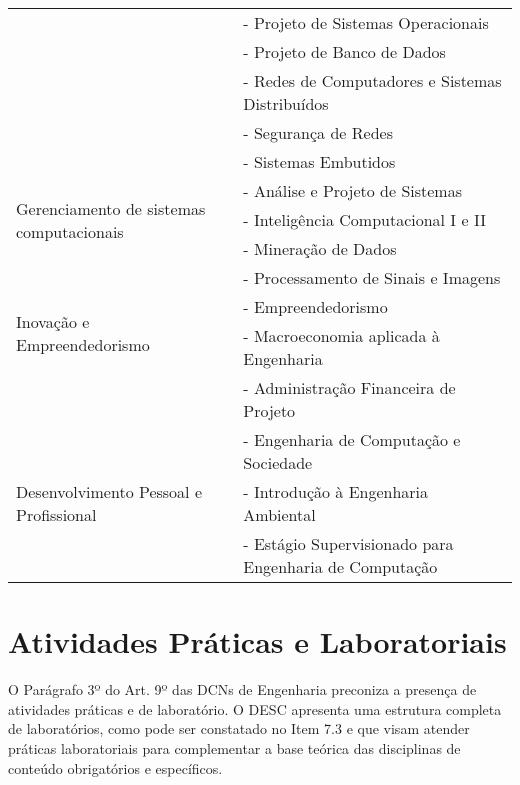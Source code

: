 \begin{table}[ht]
\begin{tabularx}{\textwidth}{ p{4cm} p{8cm} }
    & - Projeto de Sistemas Operacionais \\ 
    
    & - Projeto de Banco de Dados \\ 
    
    & - Redes de Computadores e Sistemas Distribuídos \\ 
    
    & - Segurança de Redes \\ 
    
    & - Sistemas Embutidos \\ 
    
    \hline
    
    \multirow{3}{=}{Gerenciamento de sistemas computacionais} 
    & - Análise e Projeto de Sistemas \\
    
    & - Inteligência Computacional I e II \\ 
    
    & - Mineração de Dados \\ 
    
    & - Processamento de Sinais e Imagens\\
    
    \hline
    
    \multirow{2}{=}{Inovação e Empreendedorismo } 
    & - Empreendedorismo \\ 
    
    & - Macroeconomia aplicada à Engenharia \\ 
    
    & - Administração Financeira de Projeto \\
    
    \hline
    
    \multirow{4}{=}{Desenvolvimento Pessoal e Profissional}
    & - Engenharia de Computação e Sociedade \\ 
    
    & - Introdução à Engenharia Ambiental \\ 
    
    & - Estágio Supervisionado para Engenharia de Computação \\
    
    \hline
    
\end{tabularx}
\end{table} 

\section{Atividades Práticas e Laboratoriais}
O Parágrafo 3º do Art. 9º das DCNs de Engenharia preconiza a presença de 
atividades práticas e de laboratório. O DESC apresenta uma estrutura completa de laboratórios, como pode ser constatado no Item 7.3 e 
que visam atender práticas laboratoriais para complementar a base teórica das disciplinas de conteúdo obrigatórios e específicos.

